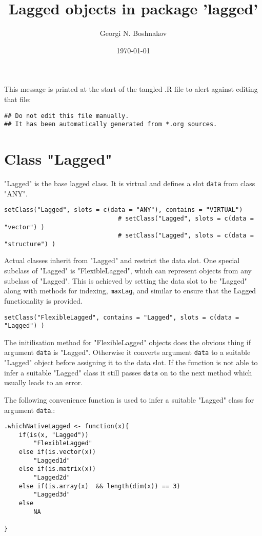 \documentclass[11pt,a4paper]{article}
\author{Georgi N. Boshnakov}
\date{\today}
\title{Lagged objects in package 'lagged'}
\begin{document}
\maketitle
\tableofcontents

\vspace*{1cm}
This message is printed at the start of the tangled .R file to alert against editing that
file:
\begin{verbatim}
## Do not edit this file manually.
## It has been automatically generated from *.org sources.
\end{verbatim}



\section{Class "Lagged"}
\label{sec:orgd054dcf}


"Lagged" is the base lagged class. It is virtual and defines a slot \texttt{data} from class
"ANY".
\begin{verbatim}
setClass("Lagged", slots = c(data = "ANY"), contains = "VIRTUAL")
                               # setClass("Lagged", slots = c(data = "vector") )
                               # setClass("Lagged", slots = c(data = "structure") )
\end{verbatim}

Actual classes inherit from "Lagged" and restrict the data slot.  One special subclass
of "Lagged" is "FlexibleLagged", which can represent objects from any subclass of
"Lagged". This is achieved by setting  the data slot to be "Lagged" along with methods for
indexing, \texttt{maxLag}, and similar to ensure that the Lagged functionality is provided.
\begin{verbatim}
setClass("FlexibleLagged", contains = "Lagged", slots = c(data = "Lagged") )
\end{verbatim}
The initilisation method for "FlexibleLagged" objects does the obvious thing if argument
\texttt{data} is "Lagged". Otherwise it converts argument \texttt{data} to a suitable "Lagged" object
before assigning it to the data slot. If the function is not able to infer a suitable
"Lagged" class it still passes \texttt{data} on to the next method which usually leads to an error.

The following convenience function is used to infer a suitable "Lagged" class for argument
\texttt{data}.:
\begin{verbatim}
.whichNativeLagged <- function(x){
    if(is(x, "Lagged"))
        "FlexibleLagged"
    else if(is.vector(x))
        "Lagged1d"
    else if(is.matrix(x))
        "Lagged2d"
    else if(is.array(x)  && length(dim(x)) == 3)
        "Lagged3d"
    else
        NA

}
\end{verbatim}
\end{document}
